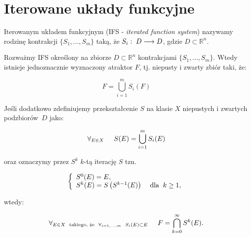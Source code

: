 \documentclass{mini}
\begin{document}
\chapter{Iterowane układy funkcyjne}

\begin{df}
Iterowanym układem funkcyjnym (IFS - \textit{iterated function system}) nazywamy rodzinę kontrakcji $\lbrace S_1,\ldots,S_m\rbrace$ taką, że $S_i:\hspace{1mm} D \longrightarrow D$, gdzie $D\subset\mathbb{R}^n$.
\end{df}

\begin{tw}
Rozważmy IFS określony na zbiorze $D \subset \mathbb{R}^{n}$ kontrakcjami $ \lbrace S_1, \ldots,S_m \rbrace $. Wtedy istnieje jednoznacznie wyznaczony atraktor $F$, tj. niepusty i zwarty zbiór taki, że:

\begin{equation}\label{d1}
F = \bigcup^{m}_{i=1}{S_i(F)} 
\end{equation}

Jeśli dodatkowo zdefiniujemy przekształcenie $S$ na klasie $X$ niepustych i zwartych podzbiorów~$D$ jako:

\begin{equation}\label{d3}
\forall_{E \in X} \hspace{5mm} S(E) = \bigcup^{m}_{i=1} S_i(E)
\end{equation}

oraz oznaczymy przez $S^k$  $k$-tą iterację $S$ tzn. 

$$ 
\left\{ 
\begin{array}{l}
S^0(E) = E ,\\
S^k(E) = S\left(S^{k-1}(E)\right) \hspace{4mm}\textrm{dla} \hspace{2mm} k \geq 1, 
\end{array}
\right.
$$

wtedy:

\begin{equation}\label{d2}
\forall_{E \in X \hspace{2mm} \textrm{takiego, że} \hspace{2mm} \forall_{i=1,\ldots ,m} \hspace{2mm} S_i(E) \subset E} \hspace{5mm} F = \bigcap^{\infty}_{k=0} S^k(E).
\end{equation}
\end{tw}
\end{document}
